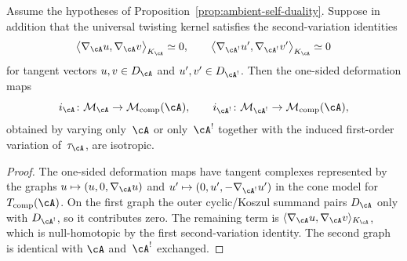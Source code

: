 \begin{proposition}
\label{prop:one-sided-isotropy}
Assume the hypotheses of
Proposition~\textup{\ref{prop:ambient-self-duality}}. Suppose in
addition that the universal twisting kernel satisfies the
second-variation identities
\[
\big\langle \nabla_\cA u,\nabla_\cA v\big\rangle_{K_\cA}
\simeq 0,
\qquad
\big\langle \nabla_{\cA^!} u',\nabla_{\cA^!} v'
\big\rangle_{K_\cA}
\simeq 0
\]
for tangent vectors
$u,v\in D_\cA$ and
$u',v'\in D_{\cA^!}$. Then the one-sided deformation maps
\[
i_\cA \colon \mathcal{M}_\cA \to \mathcal{M}_{\mathrm{comp}}(\cA),
\qquad
i_{\cA^!} \colon \mathcal{M}_{\cA^!}
 \to \mathcal{M}_{\mathrm{comp}}(\cA),
\]
obtained by varying only~$\cA$ or only~$\cA^!$ together with the
induced first-order variation of~$\tau_\cA$, are isotropic.
\end{proposition}

\begin{proof}
The one-sided deformation maps
have tangent complexes represented by the graphs
$u\mapsto (u,0,\nabla_\cA u)$ and
$u'\mapsto (0,u',-\nabla_{\cA^!}u')$ in the cone model for
$T_{\mathrm{comp}}(\cA)$. On the first graph the outer
cyclic/Koszul summand pairs $D_\cA$ only with
$D_{\cA^!}$, so it contributes zero. The remaining term is
$\langle\nabla_\cA u,\nabla_\cA v\rangle_{K_\cA}$, which is
null-homotopic by the first second-variation identity. The
second graph is identical with $\cA$ and~$\cA^!$ exchanged.
\end{proof}

